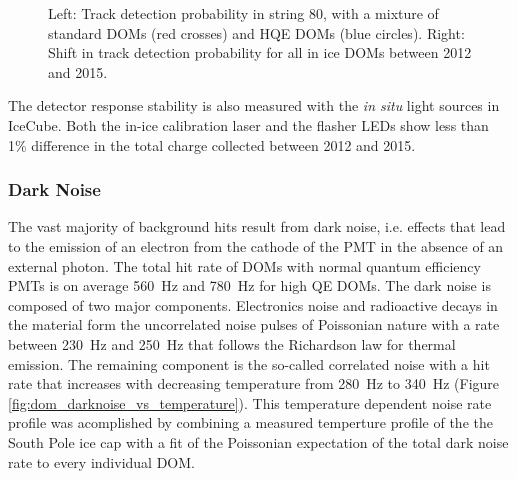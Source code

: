 \begin{figure}[!h]
  \captionsetup[subfigure]{labelformat=empty}
  \centering
  \caption{Left: Track detection probability in string 80, with a
    mixture of standard DOMs (red crosses) and HQE DOMs (blue
    circles). Right: Shift in track detection probability for all in
    ice DOMs between 2012 and 2015.}
  \label{fig:tdp}
\end{figure}

The detector response stability is also measured with the {\it in
  situ} light sources in IceCube. Both the in-ice calibration laser
\cite{IC3:SC} and the flasher LEDs show less than 1\% difference in the total
charge collected between 2012 and 2015. 

\subsubsection{\label{sect:darknoise}Dark Noise}


The vast majority of background hits result from dark noise, i.e. effects that lead to the emission of an electron from the cathode of the PMT in the absence of an external photon. The total hit rate of DOMs with normal quantum efficiency PMTs is on average \SI{560}{\hertz} and \SI{780}{\hertz} for high QE DOMs. 
The dark noise is composed of two major components. Electronics noise and radioactive decays in the material form the uncorrelated noise pulses of Poissonian nature with a rate between \SI{230}{\hertz} and \SI{250}{\hertz} that follows the Richardson law for thermal emission. 
The remaining component is the so-called correlated noise
with a hit rate that increases with decreasing temperature from \SI{280}{\hertz} to \SI{340}{\hertz} (Figure \ref{fig:dom_darknoise_vs_temperature}). 
This temperature dependent noise rate profile was acomplished by combining a measured temperture profile of the the South Pole ice cap \cite{price2002temperature} with a fit of the Poissonian expectation of the total dark noise rate to every individual DOM.


